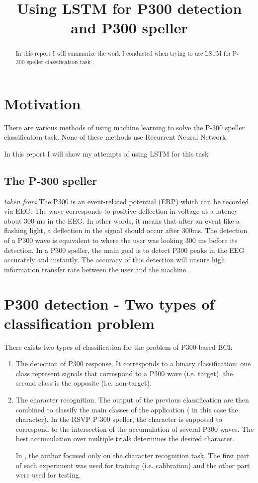 \documentclass[]{report}
\title{Using LSTM for P300 detection and P300 speller}
\author{}
\begin{document}
\maketitle

\begin{abstract}
	In this report I will summarize the work I conducted when trying to use LSTM for  P-300 speller classification task .
\end{abstract}



\section{Motivation}
There are various methods of using machine learning to solve the P-300 speller classification task. None of these methods use Recurrent Neural Network. 

In this report I will show my attempts of using LSTM for this task


\subsection{The P-300 speller }
\textit{taken from\cite{CNN_p300}}
The P300 is an event-related potential (ERP) which can be recorded via EEG. The wave corresponds to positive deflection in voltage at a latency about 300 ms in the EEG. In other words, it means that after an event like a flashing light, a deflection in the signal should occur after 300ms. The detection of a P300 wave is equivalent to where the user was looking 300 ms before its detection. In a P300 speller, the main goal is to detect P300 peaks in the EEG accurately and instantly. The accuracy of this detection will unsure high information transfer rate between the user and the machine.



\section{P300 detection - Two types of classification problem}
There exists two types of classification for the problem of P300-based BCI:
\begin{enumerate}
	\item The detection of P300 response. It corresponds to a binary classification: one class represent signals that correspond to a P300 wave (i.e. target), the second class is the opposite (i.e. non-target). 
	\item The character recognition. The output of the previous classification are then combined to classify the main classes of the application ( in this case the character). In the RSVP P-300 speller, the character is supposed to correspond to the intersection of the accumulation of several P300 waves. The best accumulation over multiple trials determines the desired character. 
	
In \cite{Blankertz}, the author focused only on the character recognition task. The first part of each experiment was used for training (i.e. calibration) and the other part were used for testing.

\end{enumerate}
\end{document}
